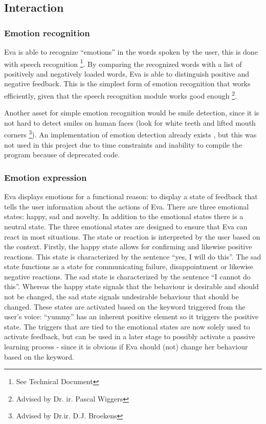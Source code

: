 \documentclass[project_eva.tex]{subfiles}
\begin{document}
\subsection*{Interaction}

\subsubsection*{Emotion recognition}
Eva is able to recognize ``emotions'' in the words spoken by the user, this is done with speech recognition \footnote{See 
Technical Document}. By comparing the recognized words with a list of positively and negatively loaded words, Eva is able to distinguish positive and negative feedback. This is the simplest form of emotion recognition that works efficiently, given that the speech recognition module works good enough \footnote{Advised by Dr. ir. Pascal Wiggers}. 

Another asset for simple emotion recognition would be smile detection, since it is not hard to detect smiles on human faces (look for white teeth and lifted mouth corners \footnote{Advised by Dr.ir. D.J. Broekens }). An implementation of emotion 
detection already exists \cite{autosmiley}, but this was not used in this project due to time 
constraints and inability to compile the program because of deprecated code.
 
\subsubsection*{Emotion expression}
\label{sec:Emotion expression}
Eva displays emotions for a functional reason: to display a state of feedback that tells the user information about the 
actions of Eva. There are three emotional states: happy, sad and novelty. In  addition to the emotional states there is a 
neutral state. The three emotional states are designed to ensure that Eva can react in most situations. The state or 
reaction is interpreted by the user based on the context. Firstly, the happy  state allows for confirming and likewise 
positive reactions. This state is characterized by the sentence ``yes, I will do this''. The sad state functions as a state 
for communicating failure, disappointment or likewise negative reactions. The sad state is characterized by the sentence 
``I cannot do this''.  Whereas the happy state signals that the behaviour is desirable and should not be changed, the sad 
state signals undesirable behaviour that should be changed. These states are activated based on the keyword triggered from 
the user’s voice: ``yummy'' has an inherent positive element so it triggers the positive state. The triggers that are tied 
to the emotional states are now solely used to activate feedback, but can be used in a later stage to possibly activate a 
passive learning process - since it is obvious if Eva should (not) change her behaviour based on the keyword.
\end{document}
